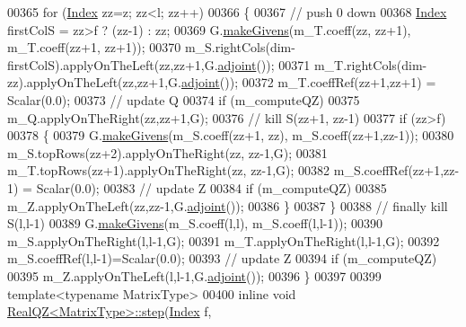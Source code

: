 \begin{DoxyCode}
00365       \textcolor{keywordflow}{for} (\hyperlink{group___eigenvalues___module_a6201e534e901b5f4e66f72c176b534a3}{Index} zz=z; zz<l; zz++)
00366       \{
00367         \textcolor{comment}{// push 0 down}
00368         \hyperlink{group___eigenvalues___module_a6201e534e901b5f4e66f72c176b534a3}{Index} firstColS = zz>f ? (zz-1) : zz;
00369         G.\hyperlink{group___jacobi___module_af73c81e9cc139b7e0d877ce553b02ec0}{makeGivens}(m\_T.coeff(zz, zz+1), m\_T.coeff(zz+1, zz+1));
00370         m\_S.rightCols(dim-firstColS).applyOnTheLeft(zz,zz+1,G.\hyperlink{group___jacobi___module_a89c8ea615f8fa77ddd5810a1e5fde4da}{adjoint}());
00371         m\_T.rightCols(dim-zz).applyOnTheLeft(zz,zz+1,G.\hyperlink{group___jacobi___module_a89c8ea615f8fa77ddd5810a1e5fde4da}{adjoint}());
00372         m\_T.coeffRef(zz+1,zz+1) = Scalar(0.0);
00373         \textcolor{comment}{// update Q}
00374         \textcolor{keywordflow}{if} (m\_computeQZ)
00375           m\_Q.applyOnTheRight(zz,zz+1,G);
00376         \textcolor{comment}{// kill S(zz+1, zz-1)}
00377         \textcolor{keywordflow}{if} (zz>f)
00378         \{
00379           G.\hyperlink{group___jacobi___module_af73c81e9cc139b7e0d877ce553b02ec0}{makeGivens}(m\_S.coeff(zz+1, zz), m\_S.coeff(zz+1,zz-1));
00380           m\_S.topRows(zz+2).applyOnTheRight(zz, zz-1,G);
00381           m\_T.topRows(zz+1).applyOnTheRight(zz, zz-1,G);
00382           m\_S.coeffRef(zz+1,zz-1) = Scalar(0.0);
00383           \textcolor{comment}{// update Z}
00384           \textcolor{keywordflow}{if} (m\_computeQZ)
00385             m\_Z.applyOnTheLeft(zz,zz-1,G.\hyperlink{group___jacobi___module_a89c8ea615f8fa77ddd5810a1e5fde4da}{adjoint}());
00386         \}
00387       \}
00388       \textcolor{comment}{// finally kill S(l,l-1)}
00389       G.\hyperlink{group___jacobi___module_af73c81e9cc139b7e0d877ce553b02ec0}{makeGivens}(m\_S.coeff(l,l), m\_S.coeff(l,l-1));
00390       m\_S.applyOnTheRight(l,l-1,G);
00391       m\_T.applyOnTheRight(l,l-1,G);
00392       m\_S.coeffRef(l,l-1)=Scalar(0.0);
00393       \textcolor{comment}{// update Z}
00394       \textcolor{keywordflow}{if} (m\_computeQZ)
00395         m\_Z.applyOnTheLeft(l,l-1,G.\hyperlink{group___jacobi___module_a89c8ea615f8fa77ddd5810a1e5fde4da}{adjoint}());
00396     \}
00397 
00399   \textcolor{keyword}{template}<\textcolor{keyword}{typename} MatrixType>
00400     \textcolor{keyword}{inline} \textcolor{keywordtype}{void} \hyperlink{group___eigenvalues___module_class_eigen_1_1_real_q_z}{RealQZ<MatrixType>::step}(\hyperlink{group___eigenvalues___module_a6201e534e901b5f4e66f72c176b534a3}{Index} f, 

\end{DoxyCode}
